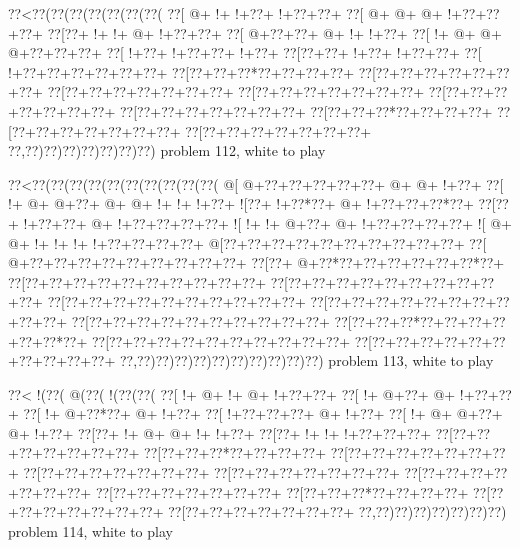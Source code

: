 \vbox{\vbox{\goo
\0??<\0??(\0??(\0??(\0??(\0??(\0??(\0??(
\0??[\- @+\- !+\- !+\0??+\- !+\0??+\0??+
\0??[\- @+\- @+\- @+\- !+\0??+\0??+\0??+
\0??[\0??+\- !+\- !+\- @+\- !+\0??+\0??+
\0??[\- @+\0??+\0??+\- @+\- !+\- !+\0??+
\0??[\- !+\- @+\- @+\- @+\0??+\0??+\0??+
\0??[\- !+\0??+\- !+\0??+\0??+\- !+\0??+
\0??[\0??+\0??+\- !+\0??+\- !+\0??+\0??+
\0??[\- !+\0??+\0??+\0??+\0??+\0??+\0??+
\0??[\0??+\0??+\0??*\0??+\0??+\0??+\0??+
\0??[\0??+\0??+\0??+\0??+\0??+\0??+\0??+
\0??[\0??+\0??+\0??+\0??+\0??+\0??+\0??+
\0??[\0??+\0??+\0??+\0??+\0??+\0??+\0??+
\0??[\0??+\0??+\0??+\0??+\0??+\0??+\0??+
\0??[\0??+\0??+\0??+\0??+\0??+\0??+\0??+
\0??[\0??+\0??+\0??*\0??+\0??+\0??+\0??+
\0??[\0??+\0??+\0??+\0??+\0??+\0??+\0??+
\0??[\0??+\0??+\0??+\0??+\0??+\0??+\0??+
\0??,\0??)\0??)\0??)\0??)\0??)\0??)\0??)
}
\hfil problem 112, white to play\hfil\break
}

\vbox{\vbox{\goo
\0??<\0??(\0??(\0??(\0??(\0??(\0??(\0??(\0??(\0??(\0??(
\- @[\- @+\0??+\0??+\0??+\0??+\0??+\- @+\- @+\- !+\0??+
\0??[\- !+\- @+\- @+\0??+\- @+\- @+\- !+\- !+\- !+\0??+
\- ![\0??+\- !+\0??*\0??+\- @+\- !+\0??+\0??+\0??*\0??+
\0??[\0??+\- !+\0??+\0??+\- @+\- !+\0??+\0??+\0??+\0??+
\- ![\- !+\- !+\- @+\0??+\- @+\- !+\0??+\0??+\0??+\0??+
\- ![\- @+\- @+\- !+\- !+\- !+\- !+\0??+\0??+\0??+\0??+
\- @[\0??+\0??+\0??+\0??+\0??+\0??+\0??+\0??+\0??+\0??+
\0??[\- @+\0??+\0??+\0??+\0??+\0??+\0??+\0??+\0??+\0??+
\0??[\0??+\- @+\0??*\0??+\0??+\0??+\0??+\0??+\0??*\0??+
\0??[\0??+\0??+\0??+\0??+\0??+\0??+\0??+\0??+\0??+\0??+
\0??[\0??+\0??+\0??+\0??+\0??+\0??+\0??+\0??+\0??+\0??+
\0??[\0??+\0??+\0??+\0??+\0??+\0??+\0??+\0??+\0??+\0??+
\0??[\0??+\0??+\0??+\0??+\0??+\0??+\0??+\0??+\0??+\0??+
\0??[\0??+\0??+\0??+\0??+\0??+\0??+\0??+\0??+\0??+\0??+
\0??[\0??+\0??+\0??*\0??+\0??+\0??+\0??+\0??+\0??*\0??+
\0??[\0??+\0??+\0??+\0??+\0??+\0??+\0??+\0??+\0??+\0??+
\0??[\0??+\0??+\0??+\0??+\0??+\0??+\0??+\0??+\0??+\0??+
\0??,\0??)\0??)\0??)\0??)\0??)\0??)\0??)\0??)\0??)\0??)
}
\hfil problem 113, white to play\hfil\break
}

\vbox{\vbox{\goo
\0??<\- !(\0??(\- @(\0??(\- !(\0??(\0??(
\0??[\- !+\- @+\- !+\- @+\- !+\0??+\0??+
\0??[\- !+\- @+\0??+\- @+\- !+\0??+\0??+
\0??[\- !+\- @+\0??*\0??+\- @+\- !+\0??+
\0??[\- !+\0??+\0??+\0??+\- @+\- !+\0??+
\0??[\- !+\- @+\- @+\0??+\- @+\- !+\0??+
\0??[\0??+\- !+\- @+\- @+\- !+\- !+\0??+
\0??[\0??+\- !+\- !+\- !+\0??+\0??+\0??+
\0??[\0??+\0??+\0??+\0??+\0??+\0??+\0??+
\0??[\0??+\0??+\0??*\0??+\0??+\0??+\0??+
\0??[\0??+\0??+\0??+\0??+\0??+\0??+\0??+
\0??[\0??+\0??+\0??+\0??+\0??+\0??+\0??+
\0??[\0??+\0??+\0??+\0??+\0??+\0??+\0??+
\0??[\0??+\0??+\0??+\0??+\0??+\0??+\0??+
\0??[\0??+\0??+\0??+\0??+\0??+\0??+\0??+
\0??[\0??+\0??+\0??*\0??+\0??+\0??+\0??+
\0??[\0??+\0??+\0??+\0??+\0??+\0??+\0??+
\0??[\0??+\0??+\0??+\0??+\0??+\0??+\0??+
\0??,\0??)\0??)\0??)\0??)\0??)\0??)\0??)
}
\hfil problem 114, white to play\hfil\break
}

